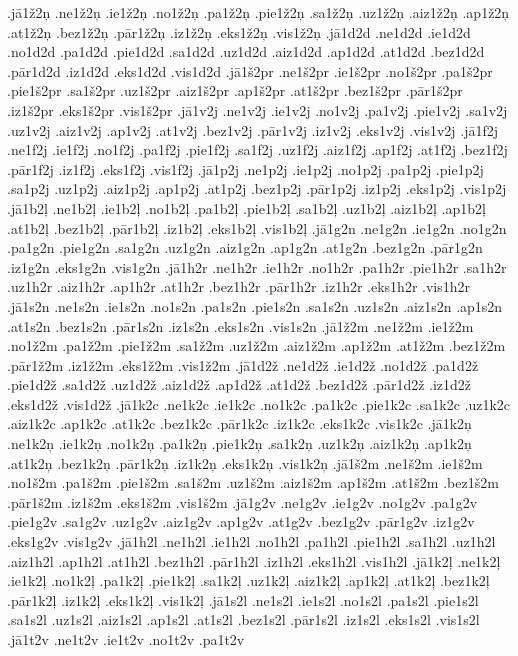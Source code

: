 {.jā1ž2ņ
.ne1ž2ņ
.ie1ž2ņ
.no1ž2ņ
.pa1ž2ņ
.pie1ž2ņ
.sa1ž2ņ
.uz1ž2ņ
.aiz1ž2ņ
.ap1ž2ņ
.at1ž2ņ
.bez1ž2ņ
.pār1ž2ņ
.iz1ž2ņ
.eks1ž2ņ
.vis1ž2ņ
.jā1d2d
.ne1d2d
.ie1d2d
.no1d2d
.pa1d2d
.pie1d2d
.sa1d2d
.uz1d2d
.aiz1d2d
.ap1d2d
.at1d2d
.bez1d2d
.pār1d2d
.iz1d2d
.eks1d2d
.vis1d2d
.jā1š2pr
.ne1š2pr
.ie1š2pr
.no1š2pr
.pa1š2pr
.pie1š2pr
.sa1š2pr
.uz1š2pr
.aiz1š2pr
.ap1š2pr
.at1š2pr
.bez1š2pr
.pār1š2pr
.iz1š2pr
.eks1š2pr
.vis1š2pr
.jā1v2j
.ne1v2j
.ie1v2j
.no1v2j
.pa1v2j
.pie1v2j
.sa1v2j
.uz1v2j
.aiz1v2j
.ap1v2j
.at1v2j
.bez1v2j
.pār1v2j
.iz1v2j
.eks1v2j
.vis1v2j
.jā1f2j
.ne1f2j
.ie1f2j
.no1f2j
.pa1f2j
.pie1f2j
.sa1f2j
.uz1f2j
.aiz1f2j
.ap1f2j
.at1f2j
.bez1f2j
.pār1f2j
.iz1f2j
.eks1f2j
.vis1f2j
.jā1p2j
.ne1p2j
.ie1p2j
.no1p2j
.pa1p2j
.pie1p2j
.sa1p2j
.uz1p2j
.aiz1p2j
.ap1p2j
.at1p2j
.bez1p2j
.pār1p2j
.iz1p2j
.eks1p2j
.vis1p2j
.jā1b2ļ
.ne1b2ļ
.ie1b2ļ
.no1b2ļ
.pa1b2ļ
.pie1b2ļ
.sa1b2ļ
.uz1b2ļ
.aiz1b2ļ
.ap1b2ļ
.at1b2ļ
.bez1b2ļ
.pār1b2ļ
.iz1b2ļ
.eks1b2ļ
.vis1b2ļ
.jā1g2n
.ne1g2n
.ie1g2n
.no1g2n
.pa1g2n
.pie1g2n
.sa1g2n
.uz1g2n
.aiz1g2n
.ap1g2n
.at1g2n
.bez1g2n
.pār1g2n
.iz1g2n
.eks1g2n
.vis1g2n
.jā1h2r
.ne1h2r
.ie1h2r
.no1h2r
.pa1h2r
.pie1h2r
.sa1h2r
.uz1h2r
.aiz1h2r
.ap1h2r
.at1h2r
.bez1h2r
.pār1h2r
.iz1h2r
.eks1h2r
.vis1h2r
.jā1s2n
.ne1s2n
.ie1s2n
.no1s2n
.pa1s2n
.pie1s2n
.sa1s2n
.uz1s2n
.aiz1s2n
.ap1s2n
.at1s2n
.bez1s2n
.pār1s2n
.iz1s2n
.eks1s2n
.vis1s2n
.jā1ž2m
.ne1ž2m
.ie1ž2m
.no1ž2m
.pa1ž2m
.pie1ž2m
.sa1ž2m
.uz1ž2m
.aiz1ž2m
.ap1ž2m
.at1ž2m
.bez1ž2m
.pār1ž2m
.iz1ž2m
.eks1ž2m
.vis1ž2m
.jā1d2ž
.ne1d2ž
.ie1d2ž
.no1d2ž
.pa1d2ž
.pie1d2ž
.sa1d2ž
.uz1d2ž
.aiz1d2ž
.ap1d2ž
.at1d2ž
.bez1d2ž
.pār1d2ž
.iz1d2ž
.eks1d2ž
.vis1d2ž
.jā1k2c
.ne1k2c
.ie1k2c
.no1k2c
.pa1k2c
.pie1k2c
.sa1k2c
.uz1k2c
.aiz1k2c
.ap1k2c
.at1k2c
.bez1k2c
.pār1k2c
.iz1k2c
.eks1k2c
.vis1k2c
.jā1k2ņ
.ne1k2ņ
.ie1k2ņ
.no1k2ņ
.pa1k2ņ
.pie1k2ņ
.sa1k2ņ
.uz1k2ņ
.aiz1k2ņ
.ap1k2ņ
.at1k2ņ
.bez1k2ņ
.pār1k2ņ
.iz1k2ņ
.eks1k2ņ
.vis1k2ņ
.jā1š2m
.ne1š2m
.ie1š2m
.no1š2m
.pa1š2m
.pie1š2m
.sa1š2m
.uz1š2m
.aiz1š2m
.ap1š2m
.at1š2m
.bez1š2m
.pār1š2m
.iz1š2m
.eks1š2m
.vis1š2m
.jā1g2v
.ne1g2v
.ie1g2v
.no1g2v
.pa1g2v
.pie1g2v
.sa1g2v
.uz1g2v
.aiz1g2v
.ap1g2v
.at1g2v
.bez1g2v
.pār1g2v
.iz1g2v
.eks1g2v
.vis1g2v
.jā1h2l
.ne1h2l
.ie1h2l
.no1h2l
.pa1h2l
.pie1h2l
.sa1h2l
.uz1h2l
.aiz1h2l
.ap1h2l
.at1h2l
.bez1h2l
.pār1h2l
.iz1h2l
.eks1h2l
.vis1h2l
.jā1k2ļ
.ne1k2ļ
.ie1k2ļ
.no1k2ļ
.pa1k2ļ
.pie1k2ļ
.sa1k2ļ
.uz1k2ļ
.aiz1k2ļ
.ap1k2ļ
.at1k2ļ
.bez1k2ļ
.pār1k2ļ
.iz1k2ļ
.eks1k2ļ
.vis1k2ļ
.jā1s2l
.ne1s2l
.ie1s2l
.no1s2l
.pa1s2l
.pie1s2l
.sa1s2l
.uz1s2l
.aiz1s2l
.ap1s2l
.at1s2l
.bez1s2l
.pār1s2l
.iz1s2l
.eks1s2l
.vis1s2l
.jā1t2v
.ne1t2v
.ie1t2v
.no1t2v
.pa1t2v
}

